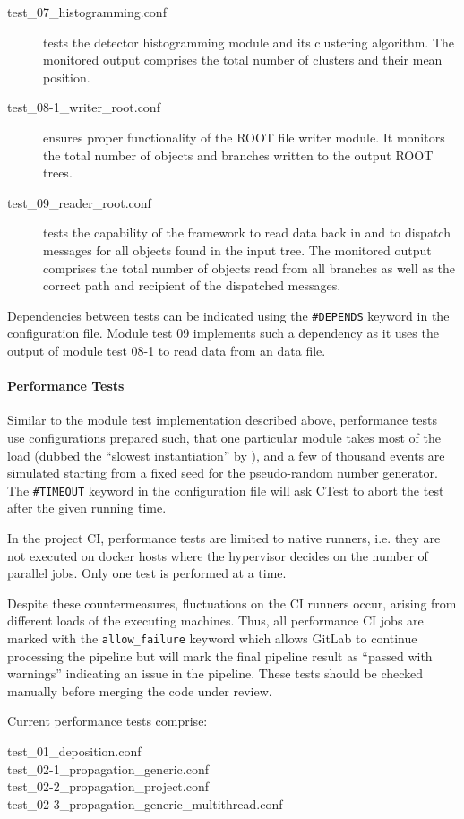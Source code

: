 \begin{description}
    \item[test\_07\_histogramming.conf] tests the detector histogramming module and its clustering algorithm. The monitored output comprises the total number of clusters and their mean position.
    \item[test\_08-1\_writer\_root.conf] ensures proper functionality of the ROOT file writer module. It monitors the total number of objects and branches written to the output ROOT trees.
    \item[test\_09\_reader\_root.conf] tests the capability of the framework to read data back in and to dispatch messages for all objects found in the input tree. The monitored output comprises the total number of objects read from all branches as well as the correct path and recipient of the dispatched messages.
\end{description}

Dependencies between tests can be indicated using the \texttt{\#DEPENDS} keyword in the configuration file.
Module test 09 implements such a dependency as it uses the output of module test 08-1 to read data from an \apsq data file.

\paragraph{Performance Tests}

Similar to the module test implementation described above, performance tests use configurations prepared such, that one particular module takes most of the load (dubbed the ``slowest instantiation'' by \apsq), and a few of thousand events are simulated starting from a fixed seed for the pseudo-random number generator.
The \texttt{\#TIMEOUT} keyword in the configuration file will ask CTest to abort the test after the given running time.

In the project CI, performance tests are limited to native runners, i.e. they are not executed on docker hosts where the hypervisor decides on the number of parallel jobs.
Only one test is performed at a time.

Despite these countermeasures, fluctuations on the CI runners occur, arising from different loads of the executing machines.
Thus, all performance CI jobs are marked with the \texttt{allow\_failure} keyword which allows GitLab to continue processing the pipeline but will mark the final pipeline result as ``passed with warnings'' indicating an issue in the pipeline.
These tests should be checked manually before merging the code under review.

Current performance tests comprise:

\begin{description}
    \item[test\_01\_deposition.conf]
    \item[test\_02-1\_propagation\_generic.conf]
    \item[test\_02-2\_propagation\_project.conf]
    \item[test\_02-3\_propagation\_generic\_multithread.conf]
\end{description}

